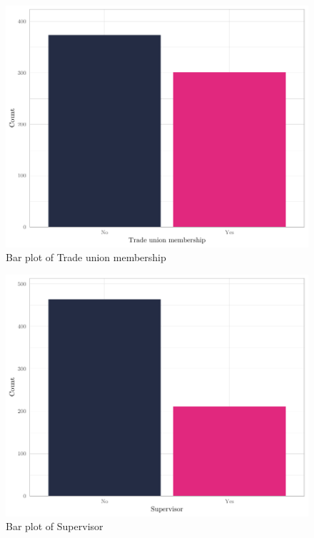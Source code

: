 \documentclass[
]{article}
\begin{document}
\begin{figure}[H]

{\centering \includegraphics[width=0.8\linewidth]{paper_files/figure-latex/unnamed-chunk-10-1} 

}

\caption{Bar plot of Trade union membership}\label{fig:unnamed-chunk-10}
\end{figure}

\begin{figure}[H]

{\centering \includegraphics[width=0.8\linewidth]{paper_files/figure-latex/unnamed-chunk-11-1} 

}

\caption{Bar plot of Supervisor}\label{fig:unnamed-chunk-11}
\end{figure}
\end{document}
